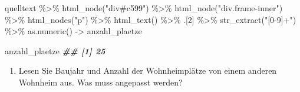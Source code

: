 \documentclass[
  ngerman,
]{article}
\newenvironment{Shaded}{\begin{snugshade}}{\end{snugshade}}
\newcommand{\DecValTok}[1]{\textcolor[rgb]{0.00,0.00,0.81}{#1}}
\newcommand{\DocumentationTok}[1]{\textcolor[rgb]{0.56,0.35,0.01}{\textbf{\textit{#1}}}}
\newcommand{\FunctionTok}[1]{\textcolor[rgb]{0.00,0.00,0.00}{#1}}
\newcommand{\NormalTok}[1]{#1}
\newcommand{\OtherTok}[1]{\textcolor[rgb]{0.56,0.35,0.01}{#1}}
\newcommand{\SpecialCharTok}[1]{\textcolor[rgb]{0.00,0.00,0.00}{#1}}
\newcommand{\StringTok}[1]{\textcolor[rgb]{0.31,0.60,0.02}{#1}}
\providecommand{\tightlist}{%
  \setlength{\itemsep}{0pt}\setlength{\parskip}{0pt}}
\begin{document}
\begin{Shaded}
\begin{Highlighting}[]
\NormalTok{quelltext }\SpecialCharTok{\%\textgreater{}\%}
  \FunctionTok{html\_node}\NormalTok{(}\StringTok{"div\#c599"}\NormalTok{) }\SpecialCharTok{\%\textgreater{}\%}
  \FunctionTok{html\_node}\NormalTok{(}\StringTok{"div.frame{-}inner"}\NormalTok{) }\SpecialCharTok{\%\textgreater{}\%}
  \FunctionTok{html\_nodes}\NormalTok{(}\StringTok{"p"}\NormalTok{) }\SpecialCharTok{\%\textgreater{}\%}
  \FunctionTok{html\_text}\NormalTok{() }\SpecialCharTok{\%\textgreater{}\%}
\NormalTok{  .[}\DecValTok{2}\NormalTok{] }\SpecialCharTok{\%\textgreater{}\%}
  \FunctionTok{str\_extract}\NormalTok{(}\StringTok{"[0{-}9]+"}\NormalTok{) }\SpecialCharTok{\%\textgreater{}\%}
  \FunctionTok{as.numeric}\NormalTok{() }\OtherTok{{-}\textgreater{}}\NormalTok{ anzahl\_plaetze}

\NormalTok{anzahl\_plaetze}
\DocumentationTok{\#\# [1] 25}
\end{Highlighting}
\end{Shaded}

\begin{enumerate}
\def\labelenumi{\arabic{enumi}.}
\setcounter{enumi}{1}
\tightlist
\item
  Lesen Sie Baujahr und Anzahl der Wohnheimplätze von einem anderen Wohnheim aus. Was muss angepasst werden?
\end{enumerate}
\end{document}
